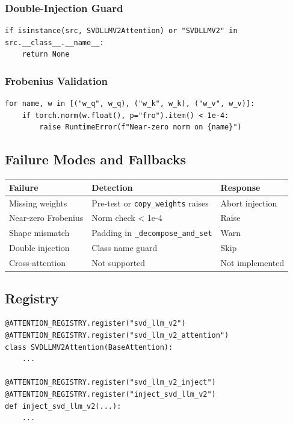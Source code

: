\subsubsection{Double-Injection Guard}

\begin{lstlisting}
if isinstance(src, SVDLLMV2Attention) or "SVDLLMV2" in src.__class__.__name__:
    return None
\end{lstlisting}

\subsubsection{Frobenius Validation}

\begin{lstlisting}
for name, w in [("w_q", w_q), ("w_k", w_k), ("w_v", w_v)]:
    if torch.norm(w.float(), p="fro").item() < 1e-4:
        raise RuntimeError(f"Near-zero norm on {name}")
\end{lstlisting}

\subsection{Failure Modes and Fallbacks}

\begin{table}[H]
\centering
\small
\begin{tabular}{lll}
\toprule
\textbf{Failure} & \textbf{Detection} & \textbf{Response} \\
\midrule
Missing weights & Pre-test or \texttt{copy\_weights} raises & Abort injection \\
Near-zero Frobenius & Norm check < 1e-4 & Raise \\
Shape mismatch & Padding in \texttt{\_decompose\_and\_set} & Warn \\
Double injection & Class name guard & Skip \\
Cross-attention & Not supported & Not implemented \\
\bottomrule
\end{tabular}
\end{table}

\subsection{Registry}

\begin{lstlisting}
@ATTENTION_REGISTRY.register("svd_llm_v2")
@ATTENTION_REGISTRY.register("svd_llm_v2_attention")
class SVDLLMV2Attention(BaseAttention):
    ...

@ATTENTION_REGISTRY.register("svd_llm_v2_inject")
@ATTENTION_REGISTRY.register("inject_svd_llm_v2")
def inject_svd_llm_v2(...):
    ...
\end{lstlisting}

